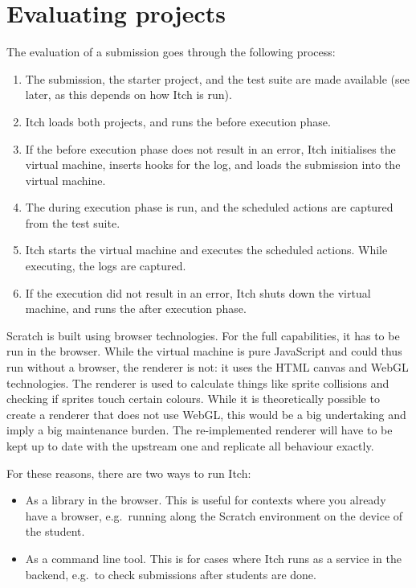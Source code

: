 \documentclass[../main]{subfiles}
\begin{document}
\section{Evaluating projects}\label{sec:itch-evaluating-projects}

The evaluation of a submission goes through the following process:

\begin{enumerate}
    \item The submission, the starter project, and the test suite are made available (see later, as this depends on how Itch is run).
    \item Itch loads both projects, and runs the before execution phase.
    \item If the before execution phase does not result in an error, Itch initialises the virtual machine, inserts hooks for the log, and loads the submission into the virtual machine.
    \item The during execution phase is run, and the scheduled actions are captured from the test suite.
    \item Itch starts the virtual machine and executes the scheduled actions.
          While executing, the logs are captured.
    \item If the execution did not result in an error, Itch shuts down the virtual machine, and runs the after execution phase.
\end{enumerate}

Scratch is built using browser technologies.
For the full capabilities, it has to be run in the browser.
While the virtual machine is pure JavaScript and could thus run without a browser, the renderer is not: it uses the HTML canvas and WebGL technologies.
The renderer is used to calculate things like sprite collisions and checking if sprites touch certain colours.
While it is theoretically possible to create a renderer that does not use WebGL, this would be a big undertaking and imply a big maintenance burden.
The re-implemented renderer will have to be kept up to date with the upstream one and replicate all behaviour exactly.

For these reasons, there are two ways to run Itch:

\begin{itemize}
    \item As a library in the browser.
          This is useful for contexts where you already have a browser, e.g.\ running along the Scratch environment on the device of the student.
    \item As a command line tool.
          This is for cases where Itch runs as a service in the backend, e.g.\ to check submissions after students are done.
\end{itemize}
\end{document}
